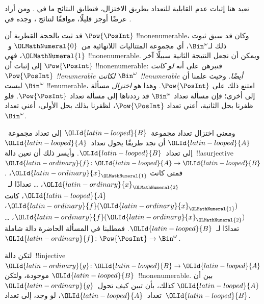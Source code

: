 \documentclass[../../../include/open-logic-section]{subfiles}
\begin{document}


\begin{editorial}
نعيد هنا إثبات عدم القابلية للتعداد بطريق الاختزال، فتطابق النتائج ما في . ومن أراد عرضًا أوجز قليلًا، موافقًا لنتائج ، وجده في .
\end{editorial}

قد ثبت بالحجة القطرية أن $\Pow{\PosInt}$ !!{nonenumerable}، وكان قد سبق ثبوت ذلك لـ$\Bin^\omega$، أي مجموعة المتتاليات اللانهائية من~${\OLMathNumeral{0}}$ و~${\OLMathNumeral{1}}$، فهي !!{nonenumerable}. ويمكن أن نجعل النتيجة الثانية سبيلًا آخر إلى إثبات أن $\Pow{\PosInt}$ !!{nonenumerable}: فنبرهن على أنه \emph{لو كانت $\Pow{\PosInt}$ !!{enumerable} لكانت $\Bin^\omega$ !!{enumerable} أيضًا}. وحيث علمنا أن $\Bin^\omega$ ليست !!{enumerable}، امتنع ذلك على $\Pow{\PosInt}$. وهذا هو \emph{اختزال} مسألة إلى أخرى؛ فإن مسألة تعداد $\Bin^\omega$ قد رددناها إلى مسألة تعداد $\Pow{\PosInt}$. فلو ظفرنا بحل الثانية، أعني تعداد $\Pow{\PosInt}$، لظفرنا بذلك بحل الأولى، أعني تعداد $\Bin^\omega$.

ومعنى اختزال تعداد مجموعة~${\OLId{latin-looped}{B}}$ إلى تعداد مجموعة~${\OLId{latin-looped}{A}}$ أن نجد طريقًا يحول تعداد~${\OLId{latin-looped}{A}}$ إلى تعداد~${\OLId{latin-looped}{B}}$. وأيسر ذلك أن نعين دالة~!!a{surjective} ${\OLId{latin-ordinary}{f}}\colon {\OLId{latin-looped}{A}} \to {\OLId{latin-looped}{B}}$. فمتى كانت ${\OLId{latin-ordinary}{x}}_{\OLMathNumeral{1}}$، ${\OLId{latin-ordinary}{x}}_{\OLMathNumeral{2}}$، \dots{} تعدادًا لـ~${\OLId{latin-looped}{A}}$، كانت ${\OLId{latin-ordinary}{f}}({\OLId{latin-ordinary}{x}}_{\OLMathNumeral{1}})$، ${\OLId{latin-ordinary}{f}}({\OLId{latin-ordinary}{x}}_{\OLMathNumeral{2}})$، \dots{} تعدادًا لـ~${\OLId{latin-looped}{B}}$. فمطلبنا في المسألة الحاضرة دالة شاملة ${\OLId{latin-ordinary}{f}}\colon \Pow{\PosInt} \to \Bin^\omega$.

\begin{prob}
لتكن دالة~!!{injective} ${\OLId{latin-ordinary}{g}}\colon {\OLId{latin-looped}{B}} \to {\OLId{latin-looped}{A}}$ موجودة، ولتكن ${\OLId{latin-looped}{B}}$~!!{nonenumerable}. بين أن ${\OLId{latin-looped}{A}}$ كذلك، بأن تبين كيف تحول~${\OLId{latin-ordinary}{g}}$ تعداد~${\OLId{latin-looped}{A}}$، لو وجد، إلى تعداد~${\OLId{latin-looped}{B}}$.
\end{prob}
\end{document}
